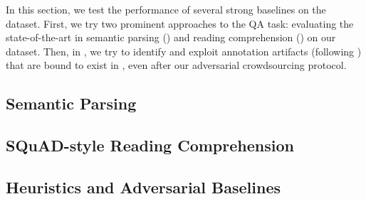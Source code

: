 In this section, we test the performance of several strong baselines on the
\drop~ dataset.
First, we try two prominent approaches to the QA task: evaluating
the state-of-the-art in semantic parsing () and reading comprehension () on our dataset.
Then, in ,
we try to identify and exploit annotation artifacts (following \cite{Gururangan:2018,Kaushik2018HowMR})
that are bound to exist in \drop, even after our adversarial crowdsourcing protocol.

\subsection{Semantic Parsing}
\label{sec:semparse}


\subsection{SQuAD-style Reading Comprehension}
\label{sec:rc}


\subsection{Heuristics and Adversarial Baselines}
\label{sec:heuristics}

